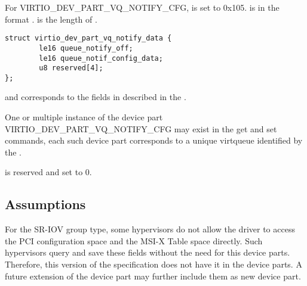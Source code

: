 For VIRTIO_DEV_PART_VQ_NOTIFY_CFG,  is set to 0x105.
 is in the format .
 is the length of .

\begin{lstlisting}
struct virtio_dev_part_vq_notify_data {
        le16 queue_notify_off;
        le16 queue_notif_config_data;
        u8 reserved[4];
};
\end{lstlisting}

 and  corresponds to the
fields in  described in the
.

One or multiple instance of the device part VIRTIO_DEV_PART_VQ_NOTIFY_CFG may exist
in the get and set commands, each such device part corresponds to a unique
virtqueue identified by the .

 is reserved and set to 0.

\subsection{Assumptions}
For the SR-IOV group type, some hypervisors do not allow the driver to access
the PCI configuration space and the MSI-X Table space directly. Such hypervisors
query and save these fields without the need for this device parts.
Therefore, this version of the specification does not have it in the device parts. A future
extension of the device part may further include them as new device part.
